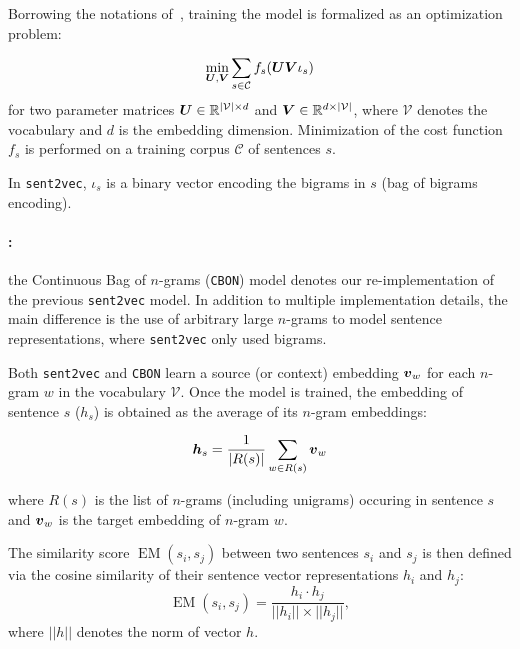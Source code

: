 Borrowing the notations of~\citet{pagliardini18unsupervised}, training the model is formalized as an optimization problem:

\begin{equation*}
\min_{\boldsymbol{U},\boldsymbol{V}} \sum_{s\in \mathcal{C}} f_{s} (\boldsymbol{UV}\iota_{s})
\end{equation*}
\noindent 
for two parameter matrices $\boldsymbol{U} \in \mathbb{R}^{|\mathcal{V}|\times d}$ and $\boldsymbol{V} \in \mathbb{R} ^{d\times |\mathcal{V}|}$, where $\mathcal{V}$ denotes the vocabulary and $d$ is the embedding dimension. Minimization of the cost function $f_{s}$ is performed on a training corpus $\mathcal{C}$ of sentences $s$.

In \texttt{sent2vec}, $\iota_{s}$ is a binary vector encoding the bigrams in $s$ (bag of bigrams encoding). 

\paragraph{:} the Continuous Bag of $n$-grams (\texttt{CBON}) 
 model denotes our re-implementation of the previous \texttt{sent2vec} model. In addition to multiple implementation details, the main difference is the use of arbitrary large $n$-grams to model sentence representations, where \texttt{sent2vec} only used bigrams.

\vspace{0.1cm}

Both \texttt{sent2vec} and \texttt{CBON} learn a source (or context) embedding $\boldsymbol{v}_w$ for each $n$-gram $w$ in the vocabulary $\mathcal{V}$.
Once the model is trained, the embedding of sentence $s$ ($h_s$) is obtained as the average of its $n$-gram embeddings:

\begin{equation*}
    \boldsymbol{h}_s = \frac{1}{|R(s)|} \sum_{w\in R(s)} \boldsymbol{v}_w
\end{equation*}

\noindent where $R(s)$ is the list of $n$-grams (including unigrams) occuring in sentence $s$ and $\boldsymbol{v}_w$ is the target embedding of $n$-gram $w$.

The similarity score $\operatorname{EM} (s_i,s_j)$ between two sentences $s_i$ and $s_j$ is then defined via the cosine similarity of their sentence vector representations $h_i$ and $h_j$:
\begin{equation*}
\operatorname{EM} (s_i, s_j) = \frac{h_i \cdot h_j}{||h_i|| \times ||h_j||},
\label{eq:EM}
\end{equation*}
\noindent where $||h||$ denotes the norm of vector $h$.


